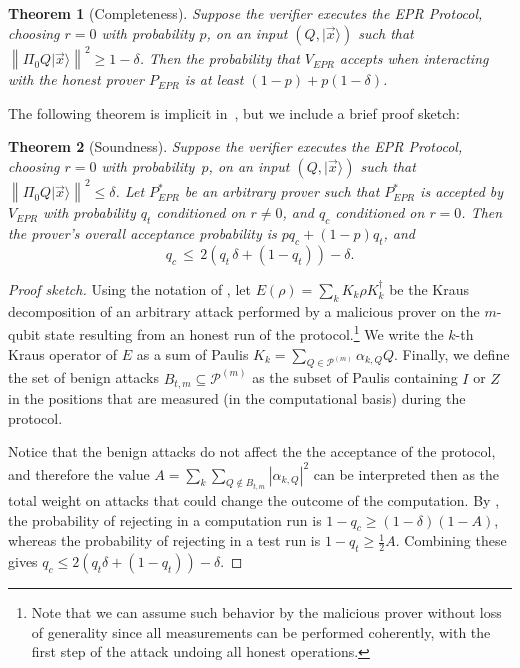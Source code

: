 \documentclass[11pt]{article}
\numberwithin{equation}{section}
\newtheorem{theorem}{Theorem}[section]
\theoremstyle{definition}
\theoremstyle{plain}
\newcommand{\ket}[1]{|#1\rangle}
\newcommand{\norm}[1]{\left\|#1\right\|}
\newcommand{\paulin}{\mathcal{P}^{(m)}\!}
\begin{document}
\begin{theorem}[Completeness]\label{thm:EPR-correctness} 
Suppose the verifier executes the EPR Protocol, choosing $r=0$ with probability $p$, on an input $(Q,\ket{\vec{x}})$ such that $\norm{\Pi_0 Q\ket{\vec{x}}}^2\geq 1-\delta$. Then the probability that $V_{EPR}$ accepts when interacting with the honest prover $P_{EPR}$ is at least $(1-p)+p(1-\delta)$. 
\end{theorem}

The following theorem is implicit in~\cite[Section 7.6]{broadbent15howtoverify}, but we include a brief proof sketch:

\begin{theorem}[Soundness]\label{thm:EPR-soundness} 
Suppose the verifier executes the EPR Protocol, choosing $r=0$ with probability~$p$, on an input $(Q,\ket{\vec{x}})$ such that $\norm{\Pi_0 Q\ket{\vec{x}}}^2\leq \delta$. Let $P_{EPR}^*$ be an arbitrary prover such that $P_{EPR}^*$ is accepted by  $V_{EPR}$ with probability $q_t$ conditioned on $r\neq 0$, and $q_c$ conditioned on $r=0$. Then the prover's overall acceptance probability is $pq_c+(1-p)q_t$, and
$$q_c \,\leq\, 2\left(q_t\,\delta+(1-q_t)\right)-\delta.$$ 
\end{theorem}
\begin{proof}[Proof sketch]
Using the notation of \cite{broadbent15howtoverify}, let $E(\rho) = \sum_{k} K_k \rho K_k^\dagger$ be the Kraus decomposition of an arbitrary attack  performed by a malicious prover on the $m$-qubit state resulting from an honest run of the protocol.\footnote{Note that we can assume such behavior by the malicious prover without loss of generality since  all measurements can be performed coherently, with the first step of the attack undoing all honest operations.}  We write the $k$-th Kraus operator of $E$ as a sum of Paulis $K_k = \sum_{Q\in
  \paulin} \alpha_{k,Q} Q$. Finally, we define the set of benign attacks $B_{t,m} \subseteq \paulin$ as the subset of Paulis containing $I$ or $Z$ in the positions that are measured (in the computational basis) during the protocol.
  
  Notice that the benign attacks do not affect the the acceptance of the protocol, and therefore the value 
$A=\sum_k\sum_{Q 
\not\in
  B_{t,m}}|\alpha_{k,Q}|^2$ can be interpreted then as the total weight on attacks that could change the outcome of the computation. By \cite{broadbent15howtoverify}, the probability of rejecting in a computation run is $1-q_c\geq (1-\delta)(1-A)$, whereas the probability of rejecting in a test run is $1-q_t\geq \frac{1}{2}A$. Combining these gives $q_c\leq 2(q_t\delta+(1-q_t))-\delta$.
\end{proof}
\end{document}
